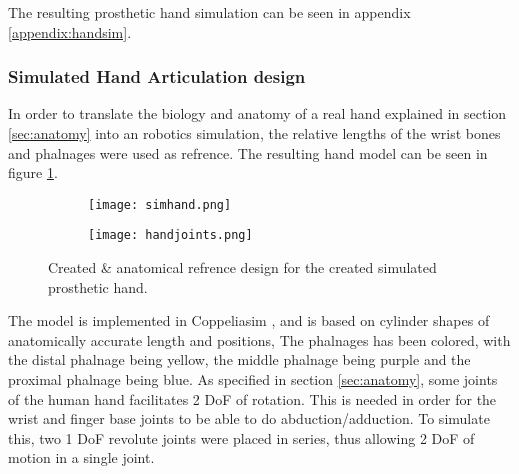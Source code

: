 \documentclass[../main.tex]{subfiles}
\begin{document}
The resulting prosthetic hand simulation can be seen in appendix \ref{appendix:handsim}.

\newpage
\subsubsection{Simulated Hand Articulation design}

In order to translate the biology and anatomy of a real hand explained in section \ref{sec:anatomy} into an robotics simulation, the relative lengths of the wrist bones and phalnages were used as refrence.
The resulting hand model can be seen in figure \ref{fig:simdesignandimpl}.

\begin{figure}[H]
    \centering
    \begin{subfigure}[b]{0.49\textwidth}
        \centering
        \texttt{[image: simhand.png]}
    \end{subfigure}
    \hfill
    \centering
    \begin{subfigure}[b]{0.49\textwidth}
        \centering
        \texttt{[image: handjoints.png]}
    \end{subfigure}
    \caption{Created \& anatomical refrence design for the created simulated prosthetic hand.}
    \label{fig:simdesignandimpl}
\end{figure}

The model is implemented in Coppeliasim \cite{coppeliasim}, and is based on cylinder shapes of anatomically accurate length and positions,
The phalnages has been colored, with the distal phalnage being yellow, the middle phalnage being purple and the proximal phalnage being blue.
As specified in section \ref{sec:anatomy}, some joints of the human hand facilitates 2 DoF of rotation.
This is needed in order for the wrist and finger base joints to be able to do \gls{abduction/adduction}.
To simulate this, two 1 DoF revolute joints were placed in series, thus allowing 2 DoF of motion in a single joint.

\end{document}
